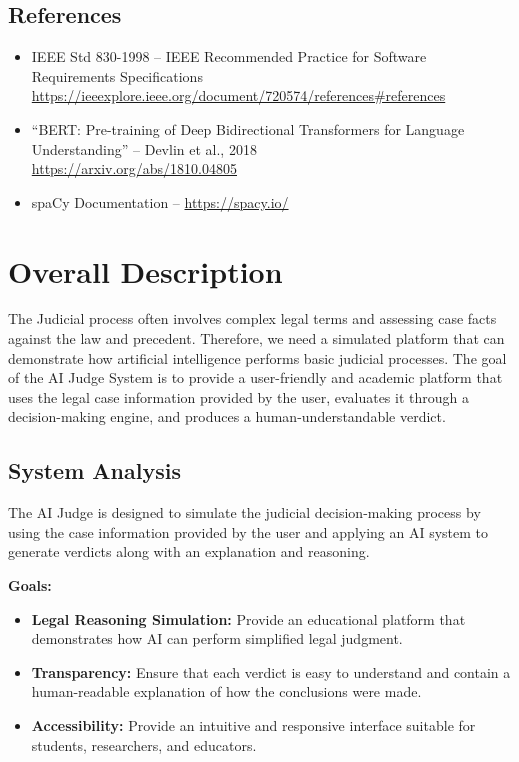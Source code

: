 \documentclass[12pt]{article}
\begin{document}
\subsection{References}

\begin{itemize}
    \item IEEE Std 830-1998 – IEEE Recommended Practice for Software Requirements Specifications\\
    \href{https://ieeexplore.ieee.org/document/720574/references#references}{https://ieeexplore.ieee.org/document/720574/references#references}

    \item ``BERT: Pre-training of Deep Bidirectional Transformers for Language Understanding'' – Devlin et al., 2018\\
    \href{https://arxiv.org/abs/1810.04805}{https://arxiv.org/abs/1810.04805}

    \item spaCy Documentation – \href{https://spacy.io/}{https://spacy.io/}
\end{itemize}


\section{Overall Description}
The Judicial process often involves complex legal terms and assessing case facts against the law and precedent. Therefore, we need a simulated platform that can demonstrate how artificial intelligence performs basic judicial processes. The goal of the AI Judge System is to provide a user-friendly and academic platform that uses the legal case information provided by the user, evaluates it through a decision-making engine, and produces a human-understandable verdict.

\subsection{System Analysis}

The AI Judge is designed to simulate the judicial decision-making process by using the case information provided by the user and applying an AI system to generate verdicts along with an explanation and reasoning.

\textbf{Goals:}
\begin{itemize}
    \item \textbf{Legal Reasoning Simulation:} Provide an educational platform that demonstrates how AI can perform simplified legal judgment.
    \item \textbf{Transparency:} Ensure that each verdict is easy to understand and contain a human-readable explanation of how the conclusions were made.
    \item \textbf{Accessibility:} Provide an intuitive and responsive interface suitable for students, researchers, and educators.
\end{itemize}
\end{document}
